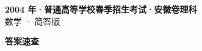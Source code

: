 \documentclass[zihao=-4, a4paper]{ctexart}
\begin{document}
\begin{center}
  {\Large\bfseries 2004 年·普通高等学校春季招生考试·安徽卷理科}\\[4pt]
  {\large 数学 · 简答版}
\end{center}
\medskip
{}

\clearpage
{}
\begin{center}{\Large\bfseries 答案速查}\end{center}
\medskip

\end{document}
